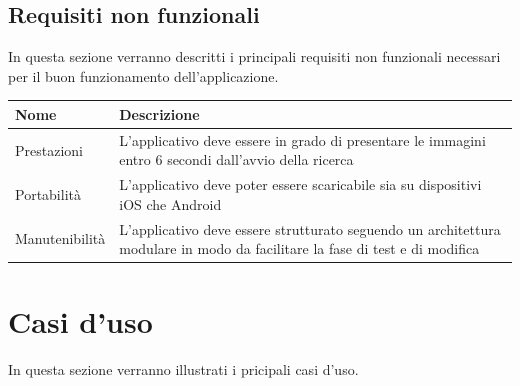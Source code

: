 \subsection{Requisiti non funzionali}
In questa sezione verranno descritti i principali requisiti non funzionali necessari per il buon funzionamento dell'applicazione.
\begin{center}
    \begin{longtable}{ | l | p{7cm} | }
        \hline
        \textbf{Nome}    & \textbf{Descrizione }                                                                                                       \\ \hline
        Prestazioni      & L'applicativo deve essere in grado di presentare le immagini entro 6 secondi dall'avvio della ricerca                       \\ \hline
        Portabilit\`a    & L'applicativo deve poter essere scaricabile sia su dispositivi iOS che Android                                              \\ \hline
        Manutenibilit\`a & L'applicativo deve essere strutturato seguendo un architettura modulare in modo da facilitare la fase di test e di modifica \\ \hline
    \end{longtable}
\end{center}

\section{Casi d'uso}

In questa sezione verranno illustrati i pricipali casi d'uso.%
